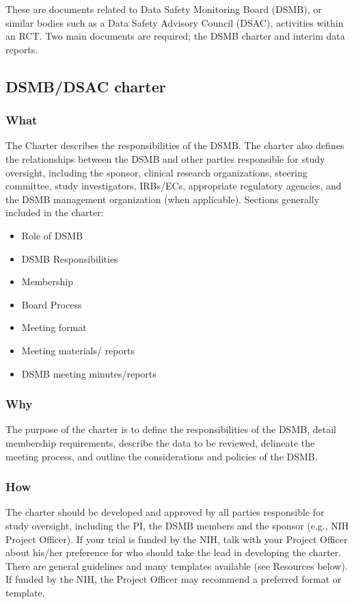 \documentclass[]{book}
\providecommand{\tightlist}{%
  \setlength{\itemsep}{0pt}\setlength{\parskip}{0pt}}
\theoremstyle{definition}
\theoremstyle{definition}
\theoremstyle{definition}
\theoremstyle{remark}
\begin{document}
These are documents related to Data Safety Monitoring Board (DSMB), or
similar bodies such as a Data Safety Advisory Council (DSAC), activities
within an RCT. Two main documents are required; the DSMB charter and
interim data reports.

\subsection{DSMB/DSAC charter}\label{dsmbdsac-charter}

\subsubsection{What}\label{what-14}

The Charter describes the responsibilities of the DSMB. The charter also
defines the relationships between the DSMB and other parties responsible
for study oversight, including the sponsor, clinical research
organizations, steering committee, study investigators, IRBs/ECs,
appropriate regulatory agencies, and the DSMB management organization
(when applicable). Sections generally included in the charter:

\begin{itemize}
\tightlist
\item
  Role of DSMB
\item
  DSMB Responsibilities
\item
  Membership
\item
  Board Process
\item
  Meeting format
\item
  Meeting materials/ reports
\item
  DSMB meeting minutes/reports
\end{itemize}

\subsubsection{Why}\label{why-14}

The purpose of the charter is to define the responsibilities of the
DSMB, detail membership requirements, describe the data to be reviewed,
delineate the meeting process, and outline the considerations and
policies of the DSMB.

\subsubsection{How}\label{how-14}

The charter should be developed and approved by all parties responsible
for study oversight, including the PI, the DSMB members and the sponsor
(e.g., NIH Project Officer). If your trial is funded by the NIH, talk
with your Project Officer about his/her preference for who should take
the lead in developing the charter. There are general guidelines and
many templates available (see Resources below). If funded by the NIH,
the Project Officer may recommend a preferred format or template.
\end{document}
